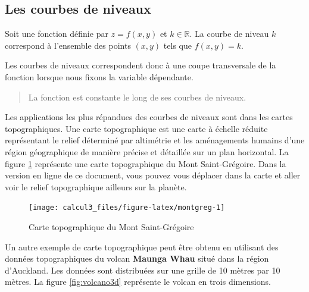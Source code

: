 \documentclass[]{book}
\theoremstyle{definition}
\theoremstyle{definition}
\theoremstyle{definition}
\theoremstyle{remark}
\let\BeginKnitrBlock\begin \let\EndKnitrBlock\end
\begin{document}
\hypertarget{les-courbes-de-niveaux}{%
\subsection{Les courbes de niveaux}\label{les-courbes-de-niveaux}}

\BeginKnitrBlock{definition}[Courbes de niveaux]
\protect\hypertarget{def:unnamed-chunk-125}{}{\label{def:unnamed-chunk-125}
{} }Soit une fonction définie par
\(z=f(x,y)\) et \(k\in\mathbb{R}\). La courbe de niveau \(k\) correspond
à l'ensemble des points \((x,y)\) tels que \(f(x,y)=k\).
\EndKnitrBlock{definition}

\BeginKnitrBlock{remark}
{}Les courbes de niveaux correspondent donc à
une coupe transversale de la fonction lorsque nous fixons la variable
dépendante.
\EndKnitrBlock{remark}

\begin{quote}
La fonction est constante le long de ses courbes de niveaux.
\end{quote}

Les applications les plus répandues des courbes de niveaux sont dans les
cartes topographiques. Une carte topographique est une carte à échelle
réduite représentant le relief déterminé par altimétrie et les
aménagements humains d'une région géographique de manière précise et
détaillée sur un plan horizontal. La figure \ref{fig:montgreg}
représente une carte topographique du Mont Saint-Grégoire. Dans la
version en ligne de ce document, vous pouvez vous déplacer dans la carte
et aller voir le relief topographique ailleurs sur la planète.

\begin{figure}

{\centering \texttt{[image: calcul3\_files/figure-latex/montgreg-1]} 

}

\caption{Carte topographique du Mont Saint-Grégoire}\label{fig:montgreg}
\end{figure}

Un autre exemple de carte topographique peut être obtenu en utilisant
des données topographiques du volcan \textbf{Maunga Whau} situé dans la
région d'Auckland. Les données sont distribuées sur une grille de 10
mètres par 10 mètres. La figure \ref{fig:volcano3d} représente le volcan
en trois dimensions.
\end{document}
